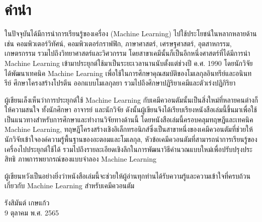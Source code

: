

{

\chapter*{\centering คำนำ}

ในปัจจุบันได้มีการนำการเรียนรู้ของเครื่อง (Machine Learning) ไปใช้ประโยชน์ในหลากหลายด้าน เช่น คอมพิวเตอร์วิทัศน์, คอมพิวเตอร์กราฟฟิก, 
ภาษาศาสตร์, เศรษฐศาสตร์, อุตสาหกรรม, เกษตรกรรม รวมไปถึงวิทยาศาสตร์และวิศวกรรม โดยสาขาเคมีนั้นก็เป็นอีกหนึ่งศาสตร์ที่ได้มีการนำ 
Machine Learning เข้ามาประยุกต์ใช้มาเป็นระยะเวลานานนับตั้งแต่ช่วงปี ค.ศ. 1990 โดยนักวิจัยได้พัฒนาเทคนิค Machine Learning 
เพื่อใช้ในการศึกษาคุณสมบัติของโมเลกุลอินทรีย์และอนินทรีย์ ศึกษาโครงสร้างโปรตีน ออกแบบโมเลกุลยา รวมไปถึงศึกษาปฏิริยาเคมีและตัวเร่งปฏิกิริยา

ผู้เขียนเล็งเห็นว่าการประยุกต์ใช้ Machine Learning กับเคมีควอนตัมนั้นเป็นสิ่งใหม่ที่หลายคนต่างก็ให้ความสนใจ ทั้งนักศึกษา อาจารย์ และนักวิจัย 
ดังนั้นผู้เขียนจึงได้เรียบเรียงหนังสือเล่มนี้ขึ้นมาเพื่อใช้เป็นแนวทางสำหรับการศึกษาและทำงานวิจัยทางด้านนี้ โดยหนังสือเล่มนี้ครอบคลุมทฤษฎีและเทคนิค 
Machine Learning, ทฤษฎีโครงสร้างเชิงอิเล็กทรอนิกส์ซึ่งเป็นสาขาหนึ่งของเคมีควอนตัมที่ช่วยให้นักวิจัยเข้าใจองค์ความรู้พื้นฐานของอะตอมและโมเลกุล, 
หัวข้อเคมีควอนตัมที่สามารถนำการเรียนรู้ของเครื่องไปประยุกต์ใช้ได้ รวมไปถึงรายละเอียดเชิงลึกในการพัฒนาวิธีคำนวณแบบใหม่เพื่อปรับปรุงประสิทธิ%
ภาพการพยากรณ์ของแบบจำลอง Machine Learning

ผู้เขียนหวังเป็นอย่างยิ่งว่าหนังสือเล่มนี้จะช่วยให้ผู้อ่านทุกท่านได้รับความรู้และความเข้าใจที่ครบถ้วนเกี่ยวกับ Machine Learning สำหรับเคมีควอนตัม

\medskip

\begin{flushright}
รังสิมันต์ เกษแก้ว \\
9 ตุลาคม พ.ศ. 2565
\end{flushright}
}

